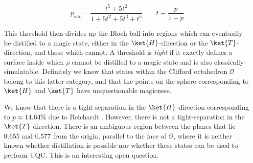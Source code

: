 \begin{equation}
p_{out} = \frac{t^5 + 5t^2}{1 + 5t^2 + 5t^3 + t^5} \qquad t \equiv \frac{p}{1-p}
\label{eqn:p_out}
\end{equation}

This threshold then divides up the Bloch ball into regions which can eventually
be distilled to a magic state, either in the $\ket{H}$-direction or the
$\ket{T}$-direction, and those which cannot. A threshold is \emph{tight}
if it exactly defines a surface inside which $\rho$ cannot be distilled to
a magic state and is also classically-simulatable. Definitely
we know that states within the Clifford octahedron $\mathcal{O}$ belong to this
latter category, and that the points on the sphere corresponding to
$\ket{H}$ and $\ket{T}$ have unquestionable magicness.

We know that there is a tight separation in the $\ket{H}$ direction 
corresponding to $p \approx 14.64\%$ due to Reichardt \cite{Reichardt2004}.
However, there is not a tight-separation in the $\ket{T}$ direction. There
is an ambiguous region between the planes that lie $0.655$ and $0.577$
from the origin, parallel to the face of $\mathcal{O}$, where it is neither
known whether distillation is possible nor whether these states can be used
to perform \textsf{UQC}. This is an interesting open question.





